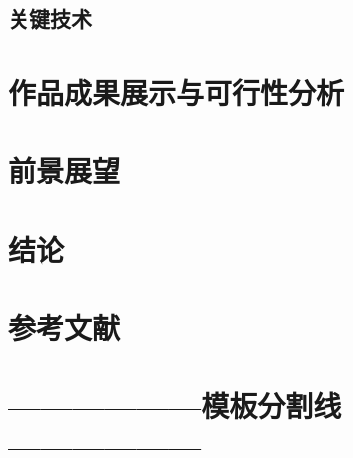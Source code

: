 \documentclass[zihao=-4]{ctexart}
\begin{document}
\subsection{关键技术}

\section{作品成果展示与可行性分析}

\section{前景展望}

\section{结论}

\section{参考文献}



\section{——————模板分割线——————}
\end{document}
